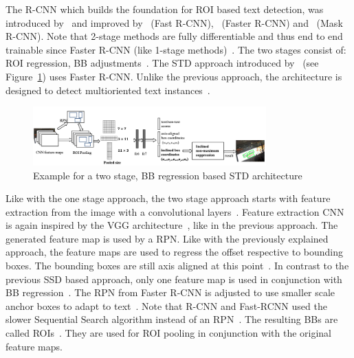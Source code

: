 The R-CNN which builds the foundation for \ac{ROI} based text detection, was introduced
by~\cite{girshick_rich_2014} and improved by~\cite{girshick_fast_2015} (Fast
R-CNN),~\cite{ren_faster_2015} (Faster R-CNN) and~\cite{he_mask_2018} (Mask R-CNN).
Note that 2-stage methods are fully differentiable and thus end to end trainable since
Faster R-CNN (like 1-stage methods)~\citep{ren_faster_2015,long_scene_2021}.
The two stages consist of: \ac{ROI} regression, \ac{BB}
adjustments~\citep{jiang_r2cnn_2017, ren_faster_2015}.
The \ac{STD} approach introduced by~\cite{jiang_r2cnn_2017} (see Figure~\ref{fig:STD-segfree-rcnn})
uses Faster R-CNN.%
Unlike the previous approach, the architecture is designed to detect multioriented text
instances~\citep{jiang_r2cnn_2017,liao_textboxes_2017}.
\begin{figure}[ht]
    \centering
    \includegraphics[width=0.8\textwidth]{img/STD-seg-free-Jiang-R2CNN-2017.png}
    \caption[Two stage, BB regression based STD architecture]{%
        Example for a two stage, BB regression based STD
        architecture~\citep{jiang_r2cnn_2017}\label{fig:STD-segfree-rcnn}
    }
\end{figure}
Like with the one stage approach, the two stage approach starts with feature extraction from the
image with a convolutional layers~\citep{jiang_r2cnn_2017}.
Feature extraction \ac{CNN} is again inspired by the VGG architecture~\citep{jiang_r2cnn_2017},
like in the previous approach.
The generated feature map is used by a \ac{RPN}.
Like with the previously explained approach, the feature maps are used to regress the offset
respective to bounding boxes.
The bounding boxes are still axis aligned at this point~\citep{jiang_r2cnn_2017}.
In contrast to the previous \ac{SSD} based approach, only one feature map is used in conjunction with
\ac{BB} regression~\citep{jiang_r2cnn_2017}.
The \ac{RPN} from Faster R-CNN is adjusted to use smaller scale anchor boxes to adapt to
text~\citep{jiang_r2cnn_2017}.
Note that R-CNN and Fast-RCNN used the slower Sequential Search algorithm instead of an
\ac{RPN}~\citep{girshick_rich_2014,girshick_fast_2015}.
The resulting \acp{BB} are called \acp{ROI}~\citep{ren_faster_2015,jiang_r2cnn_2017}.
They are used for \ac{ROI} pooling in conjunction with the original feature maps.
